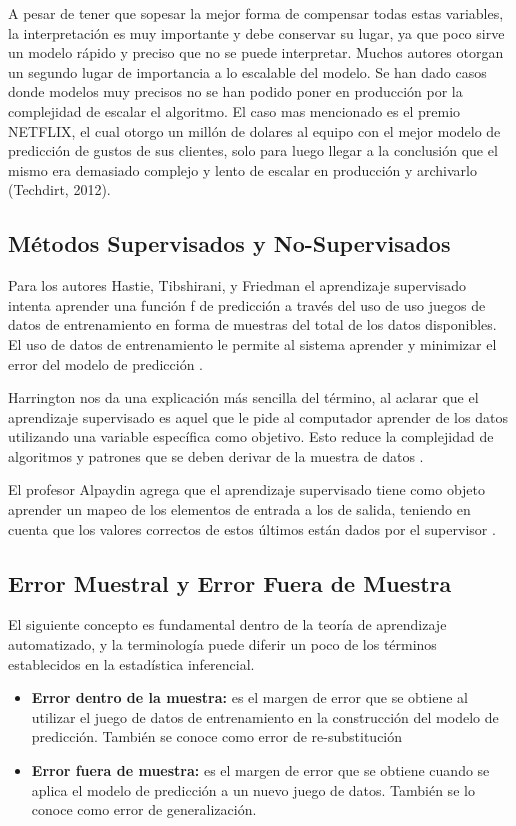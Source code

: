 \documentclass[letterpaper, spanish, 11pt]{report}
\begin{document}
A pesar de tener que sopesar la mejor forma de compensar todas estas variables, la interpretación es muy importante y debe conservar su lugar, ya que poco sirve un modelo rápido y preciso que no se puede interpretar. Muchos autores otorgan un segundo lugar de importancia a lo escalable del modelo. Se han dado casos donde modelos muy precisos no se han podido poner en producción por la complejidad de escalar el algoritmo. El caso mas mencionado es el premio NETFLIX, el cual otorgo un millón de dolares al equipo con el mejor modelo de predicción de gustos de sus clientes, solo para luego llegar a la conclusión que el mismo era demasiado complejo y lento de escalar en producción y archivarlo (Techdirt, 2012).

\subsection{Métodos Supervisados y No-Supervisados}
Para los autores Hastie, Tibshirani, y Friedman el aprendizaje supervisado intenta aprender una función f de predicción a través del uso de uso juegos de datos de entrenamiento en forma de muestras del total de los datos disponibles. El uso de datos de entrenamiento le permite al sistema aprender y minimizar el error del modelo de predicción \cite{theElements}.

Harrington nos da una explicación más sencilla del término, al aclarar que el aprendizaje supervisado es aquel que le pide al computador aprender de los datos utilizando una variable específica como objetivo. Esto reduce la complejidad de algoritmos y patrones que se deben derivar de la muestra de datos \cite{harrington}.

El profesor Alpaydin agrega que el aprendizaje supervisado tiene como objeto aprender un mapeo de los elementos de entrada a los de salida, teniendo en cuenta que los valores correctos de estos últimos están dados por el supervisor \cite{alpaydin}.

\subsection{Error Muestral y Error Fuera de Muestra}
El siguiente concepto es fundamental dentro de la teoría de aprendizaje automatizado, y la terminología puede diferir un poco de los términos establecidos en la estadística inferencial.

	\begin{itemize}
		\item \textbf{Error dentro de la muestra:} es el margen de error que se obtiene al utilizar el juego de datos de entrenamiento en la construcción del modelo de predicción. También se conoce como error de re-substitución
		\item  \textbf{Error fuera de muestra:} es el margen de error que se obtiene cuando se aplica el modelo de predicción a un nuevo juego de datos. También se lo conoce como error de generalización.
	\end{itemize}
\end{document}
